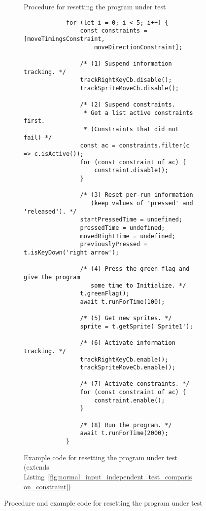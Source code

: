 \begin{figure}[htpb]
\begin{subfigure}[m]{.3\textwidth}
\begin{tikzpicture}[scale=0.9, every node/.style={scale=0.9}]
        \end{tikzpicture}
        \caption{Procedure for resetting the program under test}
        \label{fig:resetting_the_program_under_test_procedure}
    \end{subfigure}%
    \hspace{.13\textwidth}%
    \begin{subfigure}[m]{.55\textwidth}
        \centering
        \begin{verbatim}
            for (let i = 0; i < 5; i++) {
                const constraints = [moveTimingsConstraint,
                    moveDirectionConstraint];

                /* (1) Suspend information tracking. */
                trackRightKeyCb.disable();
                trackSpriteMoveCb.disable();

                /* (2) Suspend constraints.
                 * Get a list active constraints first.
                 * (Constraints that did not fail) */
                const ac = constraints.filter(c => c.isActive());
                for (const constraint of ac) {
                    constraint.disable();
                }

                /* (3) Reset per-run information
                   (keep values of 'pressed' and 'released'). */
                startPressedTime = undefined;
                pressedTime = undefined;
                movedRightTime = undefined;
                previouslyPressed = t.isKeyDown('right arrow');

                /* (4) Press the green flag and give the program
                   some time to Initialize. */
                t.greenFlag();
                await t.runForTime(100);

                /* (5) Get new sprites. */
                sprite = t.getSprite('Sprite1');

                /* (6) Activate information tracking. */
                trackRightKeyCb.enable();
                trackSpriteMoveCb.enable();

                /* (7) Activate constraints. */
                for (const constraint of ac) {
                    constraint.enable();
                }

                /* (8) Run the program. */
                await t.runForTime(2000);
            }
        \end{verbatim}
        \vspace{-\bigskipamount}
        \caption{Example code for resetting the program under test (extends Listing~\ref{fig:normal_input_independent_test_comparison_constraint})}
        \label{fig:resetting_the_program_under_test_example}
    \end{subfigure}

    \caption{Procedure and example code for resetting the program under test}
    \label{fig:resetting_the_program_under_test}
\end{figure}
